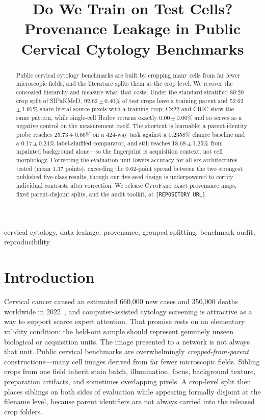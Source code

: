 \documentclass[conference]{IEEEtran}
\title{Do We Train on Test Cells? Provenance Leakage in Public Cervical Cytology Benchmarks}
\author{
\IEEEauthorblockN{Snehasish Ghosh\IEEEauthorrefmark{1},
Soham Mitra\IEEEauthorrefmark{2}, and
Nibaran Das\IEEEauthorrefmark{2}}
\IEEEauthorblockA{\IEEEauthorrefmark{1}Indian Institute of Science, Bengaluru, India\\
Email: snehasishg@iisc.ac.in}
\IEEEauthorblockA{\IEEEauthorrefmark{2}Department of Computer Science and Engineering,
Jadavpur University, Kolkata, India\\
Emails: \placeholder{SOHAM EMAIL}, \placeholder{NIBARAN EMAIL}}
}
\newcommand{\meanpm}[2]{#1\,$\pm$\,#2}
\newcommand{\cytofair}{\textsc{CytoFair}}
\newcommand{\placeholder}[1]{\texttt{[#1]}}
\begin{document}
\maketitle

\begin{abstract}
Public cervical cytology benchmarks are built by cropping many cells from far fewer microscopic fields, and the literature splits them at the crop level.
We recover the concealed hierarchy and measure what that costs.
Under the standard stratified 80:20 crop split of SIPaKMeD, \meanpm{92.62}{0.40}\% of test crops have a training parent and \meanpm{52.62}{1.97}\% share literal source pixels with a training crop; Cx22 and CRIC show the same pattern, while single-cell Herlev returns exactly \meanpm{0.00}{0.00}\% and so serves as a negative control on the measurement itself.
The shortcut is learnable: a parent-identity probe reaches \meanpm{25.73}{0.66}\% on a 424-way task against a 0.2358\% chance baseline and a \meanpm{0.17}{0.24}\% label-shuffled comparator, and still reaches \meanpm{18.68}{1.25}\% from inpainted background alone---so the fingerprint is acquisition context, not cell morphology.
Correcting the evaluation unit lowers accuracy for all six architectures tested (mean 1.37 points), exceeding the 0.62-point spread between the two strongest published five-class results, though our five-seed design is underpowered to certify individual contrasts after correction.
We release \cytofair: exact provenance maps, fixed parent-disjoint splits, and the audit toolkit, at \placeholder{REPOSITORY URL}.
\end{abstract}

\begin{IEEEkeywords}
cervical cytology, data leakage, provenance, grouped splitting, benchmark audit, reproducibility
\end{IEEEkeywords}

\section{Introduction}
Cervical cancer caused an estimated 660,000 new cases and 350,000 deaths worldwide in 2022~\cite{who2025hpv}, and computer-assisted cytology screening is attractive as a way to support scarce expert attention.
That promise rests on an elementary validity condition: the held-out sample should represent genuinely unseen biological or acquisition units.
The image presented to a network is not always that unit.
Public cervical benchmarks are overwhelmingly \emph{cropped-from-parent} constructions---many cell images derived from far fewer microscopic fields.
Sibling crops from one field inherit stain batch, illumination, focus, background texture, preparation artifacts, and sometimes overlapping pixels.
A crop-level split then places siblings on both sides of evaluation while appearing formally disjoint at the filename level, because parent identifiers are not always carried into the released crop folders.
\end{document}
